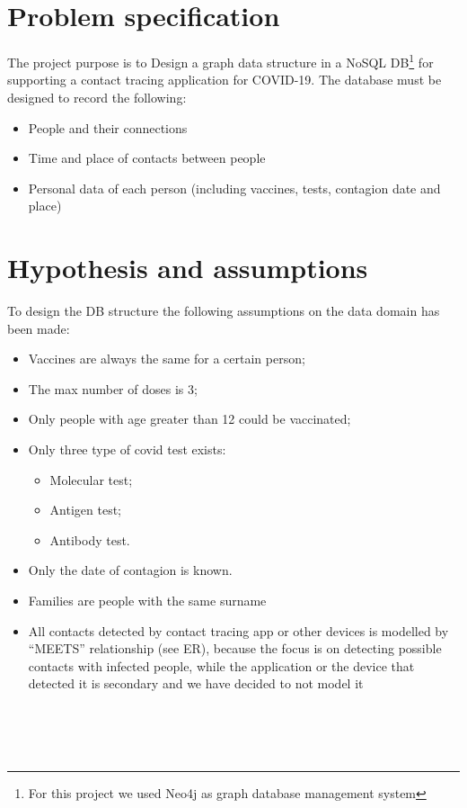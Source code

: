 \documentclass{article}
\begin{document}
		\section{Problem specification}
		The project purpose is to Design a graph data structure in a NoSQL DB\footnote{For this project we used Neo4j as graph database management system} for supporting a contact tracing application for COVID-19. The database must be designed to record the following:
		\begin{itemize}
			\item People and their connections
			\item Time and place of contacts between people
			\item Personal data of each person (including vaccines, tests, contagion date and place)
		\end{itemize}
				
				
		\section{Hypothesis and assumptions}
		To design the DB structure the following assumptions on the data domain has been made:
		\begin{itemize}
			\item Vaccines are always the same for a certain person;
			\item The max number of doses is 3;
			\item Only people with age greater than 12 could be vaccinated;
			\item Only three type of covid test exists:
			      \begin{itemize}
			      	\item Molecular test;
			      	\item Antigen test;
			      	\item Antibody test.
			      \end{itemize}
			\item Only the date of contagion is known. 
			\item Families are people with the same surname
			\item All contacts detected by contact tracing app or other devices is modelled by “MEETS” relationship (see ER), because the focus is on detecting possible contacts with infected people, while the application or the device that detected it is secondary and we have decided to not model it
		\end{itemize}
		\\
		\\
		\\
						  
\end{document}
